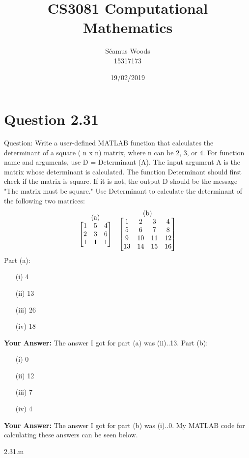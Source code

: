 \documentclass[12pt]{report}
\title{CS3081 Computational Mathematics}
\author{Séamus Woods \\ 15317173}
\date{19/02/2019}
\begin{document}
\maketitle
\newpage

\section{Question 2.31}
Question: Write a user-defined MATLAB function that calculates the determinant of a square ( n x  n) matrix, where n can be 2, 3, or 4. For function name and arguments, use D =  Determinant (A). The input argu­ment A is the matrix whose determinant is calculated. The function Determinant should first check if the matrix is square. If it is not, the output D should be the message "The matrix must be square." Use Determinant to calculate the determinant of the following two matrices: \[
\stackrel{\mbox{(a)}}{%
\begin{bmatrix}
{1} & {5} & {4} \\
{2} & {3} & {6} \\
{1} & {1} & {1} 
\end{bmatrix}%
}
\quad
\stackrel{\mbox{(b)}}{%
\begin{bmatrix}
{1} & {2} & {3} & {4} \\
{5} & {6} & {7} & {8} \\
{9} & {10} & {11} & {12} \\
{13} & {14} & {15} & {16} 
\end{bmatrix}%
}
\]
\newline
Part (a):
\begin{itemize}
\item[(i)] 4
\item[(ii)] 13
\item[(iii)] 26
\item[(iv)] 18
\end{itemize}
\textbf{Your Answer:}
\newline
The answer I got for part (a) was (ii)..13.
\newline
\newline
Part (b):
\begin{itemize}
\item[(i)] 0
\item[(ii)] 12
\item[(iii)] 7
\item[(iv)] 4
\end{itemize}
\textbf{Your Answer:}
\newline
The answer I got for part (b) was (i)..0.
\newline
\newline
My MATLAB code for calculating these answers can be seen below.

{2.31.m}
\end{document}

